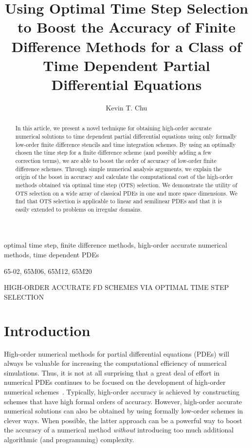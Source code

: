 \documentclass[oneeqnum,onefignum,onetabnum,onethmnum]{siamltex}
\title{Using Optimal Time Step Selection to Boost the Accuracy of
       Finite Difference Methods for a Class of 
       Time Dependent Partial Differential Equations}
\author{
Kevin T. Chu\footnotemark[2] \footnotemark[3]
}
\begin{document}

\maketitle

\renewcommand{\thefootnote}{\fnsymbol{footnote}}

\renewcommand{\thefootnote}{\fnsymbol{footnote}}

\renewcommand{\thefootnote}{\arabic{footnote}}


\begin{abstract}
In this article, we present a novel technique for obtaining high-order
accurate numerical solutions to time dependent partial differential 
equations using only formally low-order finite difference stencils and
time integration schemes.  By using an optimally chosen the time step for a 
finite difference scheme (and possibly adding a few correction terms), we 
are able to boost the order of accuracy of low-order finite difference 
schemes.  Through simple numerical analysis arguments, we explain the origin 
of the boost in accuracy and calculate the computational cost of the
high-order methods obtained via optimal time step (OTS) selection.  We 
demonstrate the utility of OTS selection on a wide array of classical PDEs
in one and more space dimensions.   We find that OTS selection is applicable 
to linear and semilinear PDEs and that it is easily extended to problems 
on irregular domains. 
\end{abstract}


\begin{keywords}
optimal time step, finite difference methods, high-order accurate numerical 
methods, time dependent PDEs
\end{keywords}

\begin{AMS}
65-02, 65M06, 65M12, 65M20
\end{AMS}

\pagestyle{myheadings}
\thispagestyle{plain}
         {HIGH-ORDER ACCURATE FD SCHEMES VIA OPTIMAL TIME STEP SELECTION} 


\section*{Introduction}
High-order numerical methods for partial differential equations (PDEs) will 
always be valuable for increasing the computational efficiency of numerical 
simulations.  Thus, it is not at all surprising that a great deal of effort in 
numerical PDEs continues to be focused on the development of high-order 
numerical schemes~\cite{bruger_2005, gibou_2005, ito_2005, shukla_2005, 
shukla_2007}.  
Typically, high-order accuracy is achieved by constructing
schemes that have high formal orders of accuracy.  However, high-order 
accurate numerical solutions can also be obtained by using formally low-order 
schemes in clever ways.  When possible, the latter approach can be a powerful 
way to boost the accuracy of a numerical method \emph{without} introducing too 
much additional algorithmic (and programming) complexity.
\end{document}
